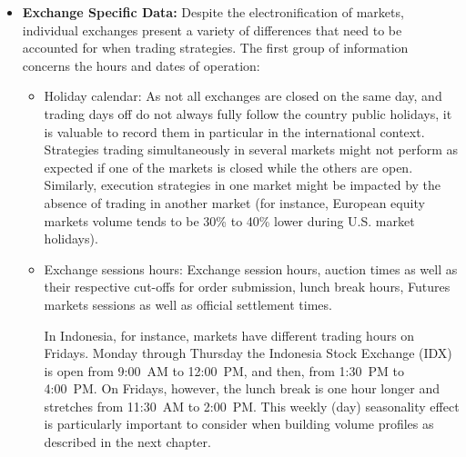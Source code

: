 \begin{itemize}
Maintaining a table of the quotation currency per instrument is also necessary in order to be able to aggregate positions at a portfolio level. Some exchanges allow the quotation of prices in currencies different from the one of the country in which the exchange is located.\footnote{For example, Jardine Matheson Holdings quotes in USD on the Singapore exchange while most of the other securities quote in Singapore Dollars.} Additionally, the Quote Factor associated with the quotation currency data needs to be stored. To account for the wide range of currency values and preserve pricing precision, market data providers might be publishing FX rates with a factor of 100 or 1000. Hence, to convert prices to USD one needs to multiply by the quote factor: usd price $=$ local price $\cdot$ fx $\cdot$ quote factor. Similarly, some exchanges quote prices in cents, and the associated quotation currency is reflected with a small cap letter: GBP/GBp, ZAR/ZAr, ILS/ILs, \dots).


\item \textbf{Exchange Specific Data:}  Despite the electronification of markets, individual exchanges present a variety of differences that need to be accounted for when trading strategies. The first group of information concerns the hours and dates of operation:
\begin{itemize}
\item Holiday calendar: As not all exchanges are closed on the same day, and trading days off do not always fully follow the country public holidays, it is valuable to record them in particular in the international context. Strategies trading simultaneously in several markets might not perform as expected if one of the markets is closed while the others are open. Similarly, execution strategies in one market might be impacted by the absence of trading in another market (for instance, European equity markets volume tends to be 30\% to 40\% lower during U.S. market holidays).

\item Exchange sessions hours: Exchange session hours, auction times as well as their respective cut-offs for order submission, lunch break hours, Futures markets sessions as well as official settlement times.

In Indonesia, for instance, markets have different trading hours on Fridays. Monday through Thursday the Indonesia Stock Exchange (IDX) is open from 9:00~AM to 12:00~PM, and then, from 1:30~PM to 4:00~PM. On Fridays, however, the lunch break is one hour longer and stretches from 11:30~AM to 2:00~PM. This weekly (day) seasonality effect is particularly important to consider when building volume profiles as described in the next chapter.


\end{itemize}
\end{itemize}

